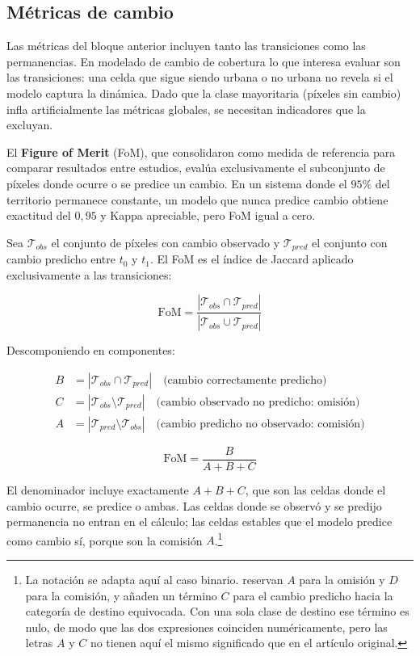 \subsection{Métricas de cambio}

Las métricas del bloque anterior incluyen tanto las transiciones como las permanencias. En modelado de cambio de cobertura lo que interesa evaluar son las transiciones: una celda que sigue siendo urbana o no urbana no revela si el modelo captura la dinámica. Dado que la clase mayoritaria (píxeles sin cambio) infla artificialmente las métricas globales, se necesitan indicadores que la excluyan.

El \textbf{Figure of Merit} (FoM), que \textcite{pontius2008comparing} consolidaron como medida de referencia para comparar resultados entre estudios, evalúa exclusivamente el subconjunto de píxeles donde ocurre o se predice un cambio. En un sistema donde el $95$\% del territorio permanece constante, un modelo que nunca predice cambio obtiene exactitud del $0{,}95$ y Kappa apreciable, pero FoM igual a cero.

Sea $\mathcal{T}_{obs}$ el conjunto de píxeles con cambio observado y $\mathcal{T}_{pred}$ el conjunto con cambio predicho entre $t_0$ y $t_1$. El FoM es el índice de Jaccard aplicado exclusivamente a las transiciones:

\begin{equation}
\text{FoM} = \frac{|\mathcal{T}_{obs} \cap \mathcal{T}_{pred}|}{|\mathcal{T}_{obs} \cup \mathcal{T}_{pred}|}
\label{eq:fom_jaccard}
\end{equation}

Descomponiendo en componentes:

\begin{align}
B &= |\mathcal{T}_{obs} \cap \mathcal{T}_{pred}| \quad \text{(cambio correctamente predicho)} \\
C &= |\mathcal{T}_{obs} \setminus \mathcal{T}_{pred}| \quad \text{(cambio observado no predicho: omisión)} \\
A &= |\mathcal{T}_{pred} \setminus \mathcal{T}_{obs}| \quad \text{(cambio predicho no observado: comisión)}
\end{align}

\begin{equation}
\boxed{\text{FoM} = \frac{B}{A + B + C}}
\label{eq:fom_formula}
\end{equation}

El denominador incluye exactamente $A + B + C$, que son las celdas donde el cambio ocurre, se predice o ambas. Las celdas donde se observó y se predijo permanencia no entran en el cálculo; las celdas estables que el modelo predice como cambio sí, porque son la comisión $A$.\footnote{La notación se adapta aquí al caso binario. \textcite{pontius2008comparing} reservan $A$ para la omisión y $D$ para la comisión, y añaden un término $C$ para el cambio predicho hacia la categoría de destino equivocada. Con una sola clase de destino ese término es nulo, de modo que las dos expresiones coinciden numéricamente, pero las letras $A$ y $C$ no tienen aquí el mismo significado que en el artículo original.}

